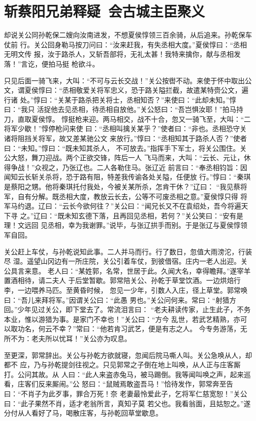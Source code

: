 \chapter{斩蔡阳兄弟释疑~会古城主臣聚义}

却说关公同孙乾保二嫂向汝南进发，不想夏侯惇领三百余骑，从后追来。孙乾保车仗前
行。关公回身勒马按刀问曰：“汝来赶我，有失丞相大度。”夏侯惇曰：“丞相无明文传
报，汝于路杀人，又斩吾部将，无礼太甚！我特来擒你，献与丞相发落！”言讫，便拍马挺
枪欲斗。

只见后面一骑飞来，大叫：“不可与云长交战！”关公按辔不动。来使于怀中取出公
文，谓夏侯惇曰：“丞相敬爱关将军忠义，恐于路关隘拦截，故遣某特赍公文，遍行诸
处。”惇曰：“关某于路杀把关将士，丞相知否？”来使曰：“此却未知。”惇曰：“我只
活捉他去见丞相，待丞相自放他。”关公怒曰：“吾岂惧汝耶！”拍马持刀，直取夏侯惇。
惇挺枪来迎。两马相交，战不十合，忽又一骑飞至，大叫：“二将军少歇！”惇停枪问来使
曰：“丞相叫擒关某乎？”使者曰：“非也。丞相恐守关诸将阻挡关将军，故又差某驰公文
来放行。”惇曰：“丞相知其于路杀人否？”使者曰：“未知。”惇曰：“既未知其杀人，
不可放去。”指挥手下军士，将关公围住。关公大怒，舞刀迎战。两个正欲交锋，阵后一人
飞马而来，大叫：“云长、元让，休得争战！”众视之，乃张辽也。二人各勒住马。张辽近
前言曰：“奉丞相钧旨：因闻知云长斩关杀将，恐于路有阻，特差我传谕各处关隘，任便放
行。”惇曰：“秦琪是蔡阳之甥。他将秦琪托付我处，今被关某所杀，怎肯干休？”辽曰：
“我见蔡将军，自有分解。既丞相大度，教放云长去，公等不可废丞相之意。”夏侯惇只得
将军马约退。辽曰：“云长今欲何往？”关公曰：“闻兄长又不在袁绍处，吾今将遍天下寻
之。”辽曰：“既未知玄德下落，且再回见丞相，若何？”关公笑曰：“安有是理！文远回
见丞相，幸为我谢罪。”说毕，与张辽拱手而别。于是张辽与夏侯惇领军自回。

关公赶上车仗，与孙乾说知此事。二人并马而行。行了数日，忽值大雨滂沱，行装尽
湿。遥望山冈边有一所庄院，关公引着车仗，到彼借宿。庄内一老人出迎。关公具言来意。
老人曰：“某姓郭，名常，世居于此。久闻大名，幸得瞻拜。”遂宰羊置酒相待，请二夫人
于后堂暂歇。郭常陪关公、孙乾于草堂饮酒。一边烘焙行李，一边喂养马匹。至黄昏时候，
忽见一少年，引数人入庄，径上草堂。郭常唤曰：“吾儿来拜将军。”因谓关公曰：“此愚
男也。”关公问何来。常曰：“射猎方回。”少年见过关公，即下堂去了。常流泪言曰：
“老夫耕读传家，止生此子，不务本业，惟以游猎为事。是家门不幸也！”关公曰：“方今
乱世，若武艺精熟，亦可以取功名，何云不幸？”常曰：“他若肯习武艺，便是有志之人。
今专务游荡，无所不为：老夫所以忧耳！”关公亦为叹息。

至更深，郭常辞出。关公与孙乾方欲就寝，忽闻后院马嘶人叫。关公急唤从人，却都不
应，乃与孙乾提剑往视之。只见郭常之子倒在地上叫唤，从人正与庄客厮打。公问其故。从
人曰：“此人来盗赤兔马，被马踢倒。我等闻叫唤之声，起来巡看，庄客们反来厮闹。”公
怒曰：“鼠贼焉敢盗吾马！”恰待发作，郭常奔至告曰：“不肖子为此歹事，罪合万死！奈
老妻最怜爱此子，乞将军仁慈宽恕！”关公曰：“此子果然不肖，适才老翁所言，真知子莫
若父也。我看翁面，且姑恕之。”遂分付从人看好了马，喝散庄客，与孙乾回草堂歇息。


